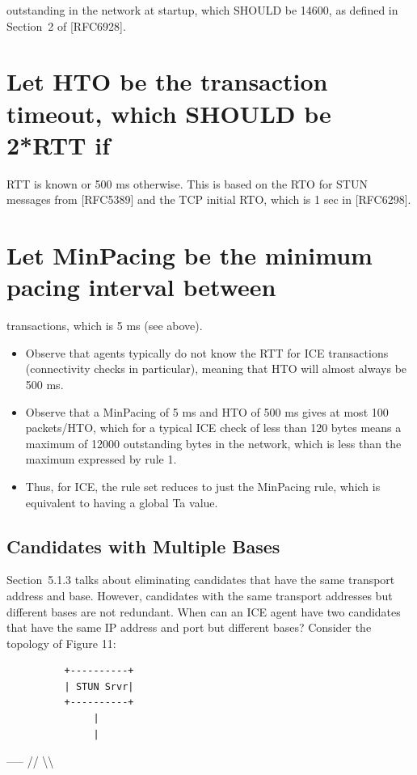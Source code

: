 \documentclass{article}
\begin{document}
outstanding in the network at startup, which SHOULD be 14600, as defined in Section~2 of [RFC6928].

\section{Let HTO be the transaction timeout, which SHOULD be 2*RTT if}

RTT is known or 500 ms otherwise.  This is based on the RTO for STUN messages from [RFC5389] and the TCP initial RTO, which is 1 sec in [RFC6298].

\section{Let MinPacing be the minimum pacing interval between}

transactions, which is 5 ms (see above).

\begin{itemize}
\item Observe that agents typically do not know the RTT for ICE transactions (connectivity checks in particular), meaning that HTO will almost always be 500 ms.
\item Observe that a MinPacing of 5 ms and HTO of 500 ms gives at most 100 packets/HTO, which for a typical ICE check of less than 120 bytes means a maximum of 12000 outstanding bytes in the network, which is less than the maximum expressed by rule 1.
\item Thus, for ICE, the rule set reduces to just the MinPacing rule, which is equivalent to having a global Ta value.
\end{itemize}
\subsection{Candidates with Multiple Bases}

Section~5.1.3 talks about eliminating candidates that have the same transport address and base.  However, candidates with the same transport addresses but different bases are not redundant.  When can an ICE agent have two candidates that have the same IP address and port but different bases?  Consider the topology of Figure 11:

\begin{verbatim}
          +----------+
          | STUN Srvr|
          +----------+
               |
               |
\end{verbatim}

----- //     \textbackslash{}\textbackslash{}
\end{document}
